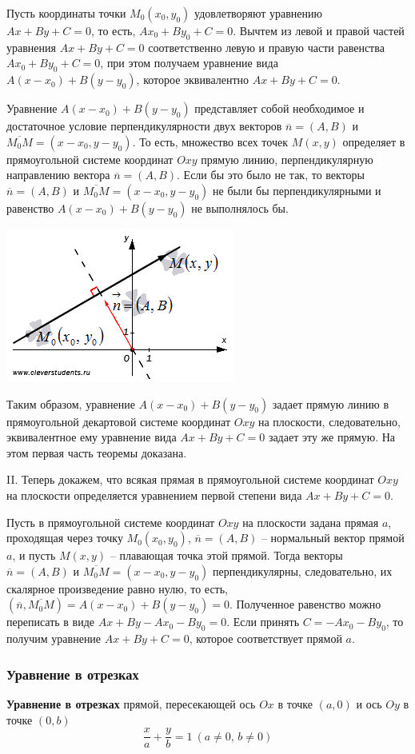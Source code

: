 \documentclass{article}
\begin{document}
Пусть координаты точки $M_0(x_0,y_0)$ удовлетворяют уравнению $Ax+By+C=0$, то есть, $Ax_0+By_0+C=0$. Вычтем из левой и правой частей уравнения $Ax+By+C=0$ соответственно левую и правую части равенства $Ax_0+By_0+C=0$, при этом получаем уравнение вида $A(x-x_0)+B(y-y_0)$, которое эквивалентно $Ax+By+C=0$.

Уравнение $A(x-x_0)+B(y-y_0)$ представляет собой необходимое и достаточное условие перпендикулярности двух векторов $\overline{n}=(A,B)$ и $\overline{M_0M}=(x-x_0,y-y_0)$. То есть, множество всех точек $M(x,y)$ определяет в прямоугольной системе координат $Oxy$ прямую линию, перпендикулярную направлению вектора $\overline{n}=(A,B)$. Если бы это было не так, то векторы $\overline{n}=(A,B)$ и $\overline{M_0M}=(x-x_0,y-y_0)$ не были бы перпендикулярными и равенство $A(x-x_0)+B(y-y_0)$ не выполнялось бы.
\begin{center}
    \includegraphics[scale=0.5]{pict001 (1).png}
\end{center}
Таким образом, уравнение $A(x-x_0)+B(y-y_0)$ задает прямую линию в прямоугольной декартовой системе координат $Oxy$ на плоскости, следовательно, эквивалентное ему уравнение вида $Ax+By+C=0$ задает эту же прямую. На этом первая часть теоремы доказана.

II. Теперь докажем, что всякая прямая в прямоугольной системе координат $Oxy$ на плоскости определяется уравнением первой степени вида $Ax+By+C=0$.

Пусть в прямоугольной системе координат $Oxy$ на плоскости задана прямая $a$, проходящая через точку $M_0(x_0,y_0)$, $\overline{n}=(A,B)$ -- нормальный вектор прямой $a$, и пусть $M(x,y)$ -- плавающая точка этой прямой. Тогда векторы $\overline{n}=(A,B)$ и $\overline{M_0M}=(x-x_0,y-y_0)$ перпендикулярны, следовательно, их скалярное произведение равно нулю, то есть, $(\overline{n},\overline{M_0M})=A(x-x_0)+B(y-y_0)=0$. Полученное равенство можно переписать в виде  $Ax+By-Ax_0-By_0=0$. Если принять $C=-Ax_0-By_0$, то получим уравнение $Ax+By+C=0$, которое соответствует прямой $a$.
\subsubsection{Уравнение в отрезках}
\textbf{Уравнение в отрезках} прямой, пересекающей ось $Ox$  в точке $(a,0)$ и ось $Oy$  в точке $(0,b)$
$$ \frac{x}{a}+\frac{y}{b}=1\:(a\neq 0,\, b\neq 0) $$
\end{document}
